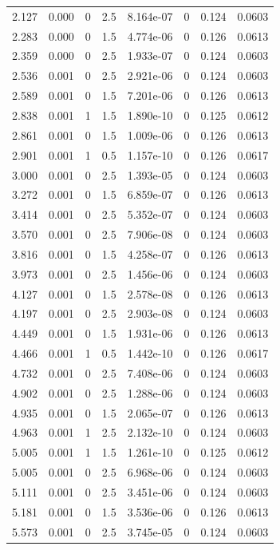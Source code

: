 \documentclass[preview]{standalone}
\begin{document}
{{\begin{tabular}{L{1.2cm}C{1.2cm} C{0.3cm}C{0.5cm} C{1.4cm}C{1.4cm} C{1.4cm}C{1.4cm}}
  2.127  &  0.000  & 0     & 2.5 &  8.164e-07  & 0  & 0.124 &  0.0603   \\ 
  2.283  &  0.000  & 0     & 1.5 &  4.774e-06  & 0  & 0.126 &  0.0613   \\ 
  2.359  &  0.000  & 0     & 2.5 &  1.933e-07  & 0  & 0.124 &  0.0603   \\ 
  2.536  &  0.001  & 0     & 2.5 &  2.921e-06  & 0  & 0.124 &  0.0603   \\ 
  2.589  &  0.001  & 0     & 1.5 &  7.201e-06  & 0  & 0.126 &  0.0613   \\ 
  2.838  &  0.001  & 1     & 1.5 &  1.890e-10  & 0  & 0.125 &  0.0612   \\ 
  2.861  &  0.001  & 0     & 1.5 &  1.009e-06  & 0  & 0.126 &  0.0613   \\ 
  2.901  &  0.001  & 1     & 0.5 &  1.157e-10  & 0  & 0.126 &  0.0617   \\ 
  3.000  &  0.001  & 0     & 2.5 &  1.393e-05  & 0  & 0.124 &  0.0603   \\ 
  3.272  &  0.001  & 0     & 1.5 &  6.859e-07  & 0  & 0.126 &  0.0613   \\ 
  3.414  &  0.001  & 0     & 2.5 &  5.352e-07  & 0  & 0.124 &  0.0603   \\ 
  3.570  &  0.001  & 0     & 2.5 &  7.906e-08  & 0  & 0.124 &  0.0603   \\ 
  3.816  &  0.001  & 0     & 1.5 &  4.258e-07  & 0  & 0.126 &  0.0613   \\ 
  3.973  &  0.001  & 0     & 2.5 &  1.456e-06  & 0  & 0.124 &  0.0603   \\ 
  4.127  &  0.001  & 0     & 1.5 &  2.578e-08  & 0  & 0.126 &  0.0613   \\ 
  4.197  &  0.001  & 0     & 2.5 &  2.903e-08  & 0  & 0.124 &  0.0603   \\ 
  4.449  &  0.001  & 0     & 1.5 &  1.931e-06  & 0  & 0.126 &  0.0613   \\ 
  4.466  &  0.001  & 1     & 0.5 &  1.442e-10  & 0  & 0.126 &  0.0617   \\ 
  4.732  &  0.001  & 0     & 2.5 &  7.408e-06  & 0  & 0.124 &  0.0603   \\ 
  4.902  &  0.001  & 0     & 2.5 &  1.288e-06  & 0  & 0.124 &  0.0603   \\ 
  4.935  &  0.001  & 0     & 1.5 &  2.065e-07  & 0  & 0.126 &  0.0613   \\ 
  4.963  &  0.001  & 1     & 2.5 &  2.132e-10  & 0  & 0.124 &  0.0603   \\ 
  5.005  &  0.001  & 1     & 1.5 &  1.261e-10  & 0  & 0.125 &  0.0612   \\ 
  5.005  &  0.001  & 0     & 2.5 &  6.968e-06  & 0  & 0.124 &  0.0603   \\ 
  5.111  &  0.001  & 0     & 2.5 &  3.451e-06  & 0  & 0.124 &  0.0603   \\ 
  5.181  &  0.001  & 0     & 1.5 &  3.536e-06  & 0  & 0.126 &  0.0613   \\ 
  5.573  &  0.001  & 0     & 2.5 &  3.745e-05  & 0  & 0.124 &  0.0603   \\ 
\hline 
\end{tabular} 

}}
\end{document}
